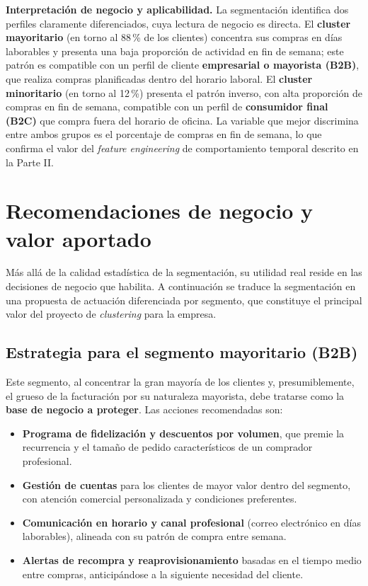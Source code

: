 \documentclass[11pt,a4paper]{article}
\begin{document}
\textbf{Interpretación de negocio y aplicabilidad.} La segmentación identifica dos perfiles claramente diferenciados, cuya lectura de negocio es directa. El \textbf{cluster mayoritario} (en torno al 88\,\% de los clientes) concentra sus compras en días laborables y presenta una baja proporción de actividad en fin de semana; este patrón es compatible con un perfil de cliente \textbf{empresarial o mayorista (B2B)}, que realiza compras planificadas dentro del horario laboral. El \textbf{cluster minoritario} (en torno al 12\,\%) presenta el patrón inverso, con alta proporción de compras en fin de semana, compatible con un perfil de \textbf{consumidor final (B2C)} que compra fuera del horario de oficina. La variable que mejor discrimina entre ambos grupos es el porcentaje de compras en fin de semana, lo que confirma el valor del \textit{feature engineering} de comportamiento temporal descrito en la Parte II.

\section{Recomendaciones de negocio y valor aportado}

Más allá de la calidad estadística de la segmentación, su utilidad real reside en las decisiones de negocio que habilita. A continuación se traduce la segmentación en una propuesta de actuación diferenciada por segmento, que constituye el principal valor del proyecto de \textit{clustering} para la empresa.

\subsection{Estrategia para el segmento mayoritario (B2B)}

Este segmento, al concentrar la gran mayoría de los clientes y, presumiblemente, el grueso de la facturación por su naturaleza mayorista, debe tratarse como la \textbf{base de negocio a proteger}. Las acciones recomendadas son:

\begin{itemize}
    \item \textbf{Programa de fidelización y descuentos por volumen}, que premie la recurrencia y el tamaño de pedido característicos de un comprador profesional.
    \item \textbf{Gestión de cuentas} para los clientes de mayor valor dentro del segmento, con atención comercial personalizada y condiciones preferentes.
    \item \textbf{Comunicación en horario y canal profesional} (correo electrónico en días laborables), alineada con su patrón de compra entre semana.
    \item \textbf{Alertas de recompra y reaprovisionamiento} basadas en el tiempo medio entre compras, anticipándose a la siguiente necesidad del cliente.
\end{itemize}
\end{document}
